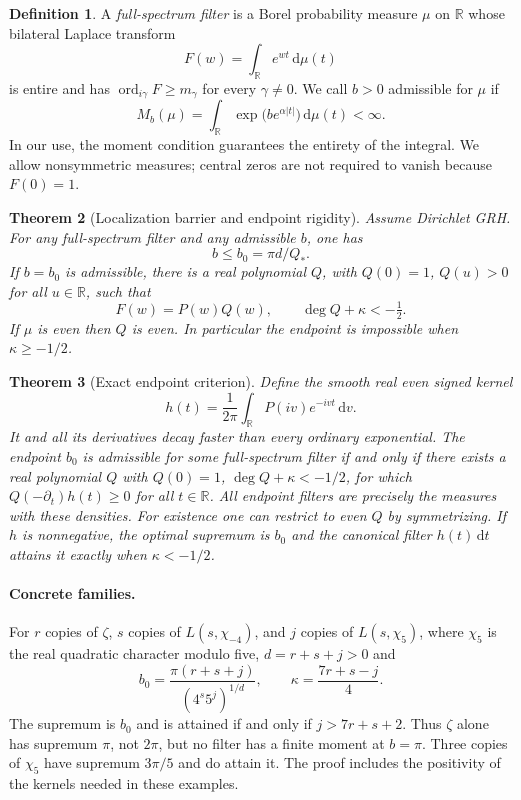\documentclass[11pt]{article}
\newtheorem{theorem}{Theorem}[section]
\theoremstyle{definition}\newtheorem{definition}[theorem]{Definition}
\theoremstyle{remark}\newtheorem{remark}[theorem]{Remark}
\newcommand{\R}{\mathbb R}\newcommand{\C}{\mathbb C}\newcommand{\dd}{\,\mathrm d}\newcommand{\ord}{\operatorname{ord}}\newcommand{\Rea}{\operatorname{Re}}\newcommand{\Ima}{\operatorname{Im}}\newcommand{\F}{\mathcal F}\newcommand{\G}{\mathcal G}\newcommand{\calL}{\mathcal L}
\begin{document}
\begin{definition} A \emph{full-spectrum filter} is a Borel probability measure $\mu$ on $\R$ whose bilateral Laplace transform
\[
 F(w)=\int_\R e^{wt}\dd\mu(t)
\]
is entire and has $\ord_{i\gamma}F\ge m_\gamma$ for every $\gamma\ne0$. We call $b>0$ admissible for $\mu$ if
\begin{equation}\label{eq:moment}
 M_b(\mu)=\int_\R \exp\bigl(b e^{\alpha |t|}\bigr)\dd\mu(t)<\infty.
\end{equation}
In our use, the moment condition guarantees the entirety of the integral. We allow nonsymmetric measures; central zeros are not required to vanish because $F(0)=1$.
\end{definition}

\begin{theorem}[Localization barrier and endpoint rigidity]\label{thm:main}
Assume Dirichlet GRH. For any full-spectrum filter and any admissible $b$, one has
\begin{equation}\label{eq:main} b\le b_0=\pi d/Q_* .\end{equation}
If $b=b_0$ is admissible, there is a real polynomial $Q$, with $Q(0)=1$, $Q(u)>0$ for all $u\in\R$, such that
\begin{equation}\label{eq:rigid}F(w)=P(w)Q(w),\qquad \deg Q+\kappa<-\tfrac12.\end{equation}
If $\mu$ is even then $Q$ is even. In particular the endpoint is impossible when $\kappa\ge-1/2$.
\end{theorem}

\begin{theorem}[Exact endpoint criterion]\label{thm:criterion}
Define the smooth real even signed kernel
\[
 h(t)=\frac1{2\pi}\int_\R P(iv)e^{-ivt}\dd v.
\]
It and all its derivatives decay faster than every ordinary exponential. The endpoint $b_0$ is admissible for some full-spectrum filter if and only if there exists a real polynomial $Q$ with $Q(0)=1$, $\deg Q+\kappa<-1/2$, for which $Q(-\partial_t)h(t)\ge0$ for all $t\in\R$. All endpoint filters are precisely the measures with these densities. For existence one can restrict to even $Q$ by symmetrizing. If $h$ is nonnegative, the optimal supremum is $b_0$ and the canonical filter $h(t)\dd t$ attains it exactly when $\kappa<-1/2$.
\end{theorem}

\paragraph{Concrete families.} For $r$ copies of $\zeta$, $s$ copies of $L(s,\chi_{-4})$, and $j$ copies of $L(s,\chi_5)$, where $\chi_5$ is the real quadratic character modulo five, $d=r+s+j>0$ and
\begin{equation}\label{eq:example} b_0=\frac{\pi(r+s+j)}{(4^s5^j)^{1/d}},\qquad \kappa=\frac{7r+s-j}{4}.\end{equation}
The supremum is $b_0$ and is attained if and only if $j>7r+s+2$. Thus $\zeta$ alone has supremum $\pi$, not $2\pi$, but no filter has a finite moment at $b=\pi$. Three copies of $\chi_5$ have supremum $3\pi/5$ and do attain it. The proof includes the positivity of the kernels needed in these examples.
\end{document}
